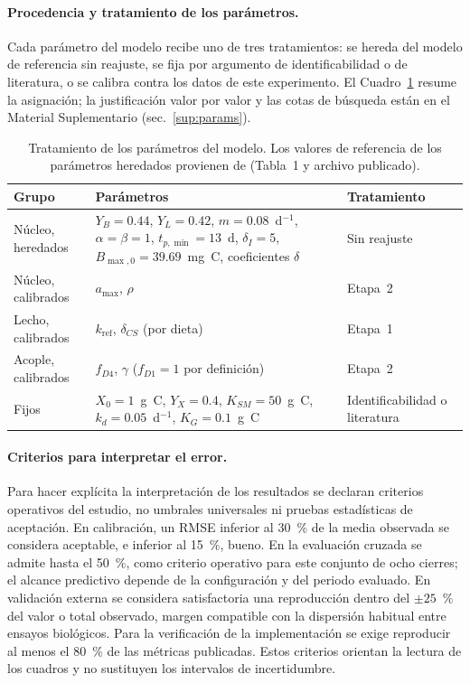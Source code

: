 
\paragraph{Procedencia y tratamiento de los parámetros.}
Cada parámetro del modelo recibe uno de tres tratamientos: se hereda del modelo de referencia sin reajuste, se fija por argumento de identificabilidad o de literatura, o se calibra contra los datos de este experimento. El Cuadro~\ref{tab:procedencia} resume la asignación; la justificación valor por valor y las cotas de búsqueda están en el Material Suplementario (sec.~\ref{sup:params}).

\begin{table}[htbp]
  \centering
  \small
  \caption{Tratamiento de los parámetros del modelo. Los valores de referencia de los parámetros heredados provienen de \textcite{eriksenDynamicModellingFeed2022} (Tabla~1 y archivo publicado).}
  \label{tab:procedencia}
  \begin{tabular}{lp{7.2cm}l}
    \toprule
    Grupo & Parámetros & Tratamiento \\
    \midrule
    Núcleo, heredados & $Y_B = 0.44$, $Y_L = 0.42$, $m = 0.08$~d$^{-1}$, $\alpha = \beta = 1$, $t_{p,\min} = 13$~d, $\delta_I = 5$, $B_{\max,0} = 39.69$~mg~C, coeficientes $\delta$ & Sin reajuste \\
    Núcleo, calibrados & $a_{\max}$, $\rho$ & Etapa~2 \\
    Lecho, calibrados & $k_{\mathrm{ref}}$, $\delta_{CS}$ (por dieta) & Etapa~1 \\
    Acople, calibrados & $f_{D4}$, $\gamma$ ($f_{D1} = 1$ por definición) & Etapa~2 \\
       Fijos & $X_0 = 1$~g~C, $Y_X = 0.4$, $K_{SM} = 50$~g~C, $k_d = 0.05$~d$^{-1}$, $K_G = 0.1$~g~C & Identificabilidad o literatura \\
    \bottomrule
  \end{tabular}
\end{table}

\paragraph{Criterios para interpretar el error.}
Para hacer explícita la interpretación de los resultados se declaran criterios operativos del estudio, no umbrales universales ni pruebas estadísticas de aceptación. En calibración, un RMSE inferior al 30~\% de la media observada se considera aceptable, e inferior al 15~\%, bueno. En la evaluación cruzada se admite hasta el 50~\%, como criterio operativo para este conjunto de ocho cierres; el alcance predictivo depende de la configuración y del periodo evaluado. En validación externa se considera satisfactoria una reproducción dentro del $\pm 25$~\% del valor o total observado, margen compatible con la dispersión habitual entre ensayos biológicos. Para la verificación de la implementación se exige reproducir al menos el 80~\% de las métricas publicadas. Estos criterios orientan la lectura de los cuadros y no sustituyen los intervalos de incertidumbre.

